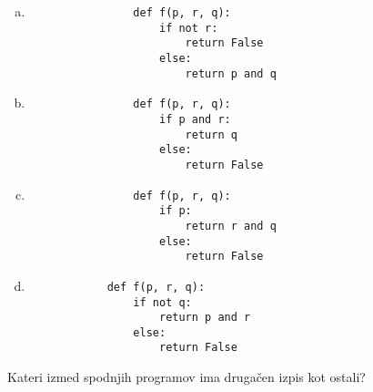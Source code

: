 \documentclass[arhiv, 10pt]{../izpit}
\begin{document}
        \begin{multicols}{2}
        \begin{enumerate}[(a)]
\item 
                \begin{verbatim}
                def f(p, r, q):
                    if not r:
                        return False
                    else:
                        return p and q
                \end{verbatim}
            
\item 
                \begin{verbatim}
                def f(p, r, q):
                    if p and r:
                        return q
                    else:
                        return False
                \end{verbatim}
            
\item 
                \begin{verbatim}
                def f(p, r, q):
                    if p:
                        return r and q
                    else:
                        return False
                \end{verbatim}
            
\item 
            \begin{verbatim}
            def f(p, r, q):
                if not q:
                    return p and r
                else:
                    return False
            \end{verbatim}
        
\end{enumerate}

        \end{multicols}
    
        \naloga*
        
        Kateri izmed spodnjih programov ima drugačen izpis kot ostali?
    
\end{document}
